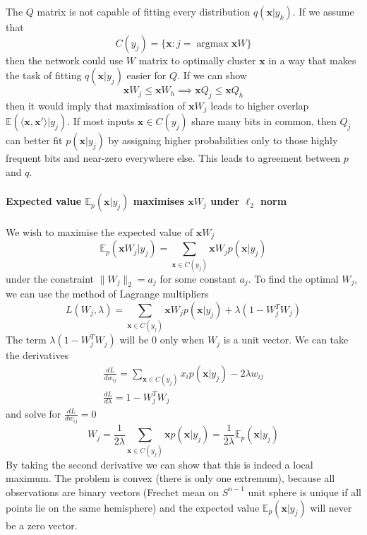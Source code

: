 \documentclass[12pt]{article}
\DeclareMathOperator*{\argmax}{argmax}
\begin{document}
The $Q$ matrix is not capable of fitting every distribution $q(\boldsymbol{x}|y_k)$.
If we assume that
\[
C(y_j) = \{\boldsymbol{x}:j=\argmax \boldsymbol{x}W\}
\]
then the network could use $W$ matrix to optimally cluster $\boldsymbol{x}$ in a way that makes the task of fitting $q(\boldsymbol{x}|y_j)$ easier for $Q$. If we can show
\[
\boldsymbol{x}W_j \le \boldsymbol{x}W_h  \implies  \boldsymbol{x}Q_j \le \boldsymbol{x}Q_h 
\]
then it would imply that maximisation of $\boldsymbol{x}W_j$ leads to higher overlap
$\mathbb{E}(\langle \boldsymbol{x}, \boldsymbol{x}'\rangle|y_j) $. If most inputs $\boldsymbol{x}\in C(y_j)$ share many bits in common, then $Q_j$ can better fit $p(\boldsymbol{x}|y_j)$ by assigning higher probabilities only to those highly frequent bits and near-zero everywhere else. This leads to agreement between $p$ and $q$. 



\paragraph{Expected value $\mathbb{E}_{p}(\boldsymbol{x}|y_j)$ maximises $\boldsymbol{x}W_j$ under $\ell_2$ norm} 

We wish to maximise the expected value of $\boldsymbol{x}W_j$
\[
\mathbb{E}_{p}(\boldsymbol{x}W_j|y_j)=\sum_{\boldsymbol{x}\in C(y_j)} \boldsymbol{x} W_j p(\boldsymbol{x}|y_j)
\]
 under the constraint $\lVert W_j \rVert_2 = a_j$ for some constant $a_j$.  To find the optimal $W_j$, we can use the method of Lagrange multipliers
\[
L(W_j,\lambda) = \sum_{\boldsymbol{x}\in C(y_j)} \boldsymbol{x} W_j p(\boldsymbol{x}|y_j) + \lambda(1- W_j^{T}W_j )
\]
The term $\lambda(1- W_j^{T}W_j)$ will be $0$ only when $W_j$ is a unit vector.
We can take the derivatives 
\begin{gather*}
	\frac{d L}{d w_{ij}} = \sum_{\boldsymbol{x}\in C(y_j)} x_i p(\boldsymbol{x}|y_j) - 2\lambda w_{ij} \\
	\frac{d L}{d \lambda} = 1 - W_j^{T}W_j
\end{gather*}
and solve for $\frac{d L}{d w_{ij}}=0$
\[
W_j = \frac{1}{2\lambda }\sum_{\boldsymbol{x}\in C(y_j)} \boldsymbol{x} p(\boldsymbol{x}|y_j)  = \frac{1}{2\lambda } \mathbb{E}_{p}(\boldsymbol{x}|y_j)
\]
By taking the second derivative we can show that this is indeed a local maximum.
The problem is convex (there is only one extremum), because all observations are binary vectors (Frechet mean on $S^{n-1}$ unit sphere is unique if all points lie on the same hemisphere) and the expected value $\mathbb{E}_{p}(\boldsymbol{x}|y_j)$ will never be a zero vector.
\end{document}
